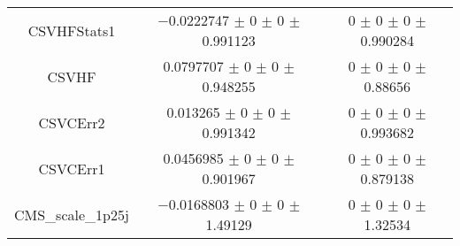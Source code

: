 \begin{table}
\begin{tabular}{ccc}
CSVHFStats1 & \num{-0.0222747} $\pm$ \num{0} $\pm$ \num{0} $\pm$ \num{0.991123} & \num{0} $\pm$ \num{0} $\pm$ \num{0} $\pm$ \num{0.990284}\\
CSVHF & \num{0.0797707} $\pm$ \num{0} $\pm$ \num{0} $\pm$ \num{0.948255} & \num{0} $\pm$ \num{0} $\pm$ \num{0} $\pm$ \num{0.88656}\\
CSVCErr2 & \num{0.013265} $\pm$ \num{0} $\pm$ \num{0} $\pm$ \num{0.991342} & \num{0} $\pm$ \num{0} $\pm$ \num{0} $\pm$ \num{0.993682}\\
CSVCErr1 & \num{0.0456985} $\pm$ \num{0} $\pm$ \num{0} $\pm$ \num{0.901967} & \num{0} $\pm$ \num{0} $\pm$ \num{0} $\pm$ \num{0.879138}\\
CMS\_scale\_1p25j & \num{-0.0168803} $\pm$ \num{0} $\pm$ \num{0} $\pm$ \num{1.49129} & \num{0} $\pm$ \num{0} $\pm$ \num{0} $\pm$ \num{1.32534}\\
\bottomrule
\end{tabular}
\end{table}